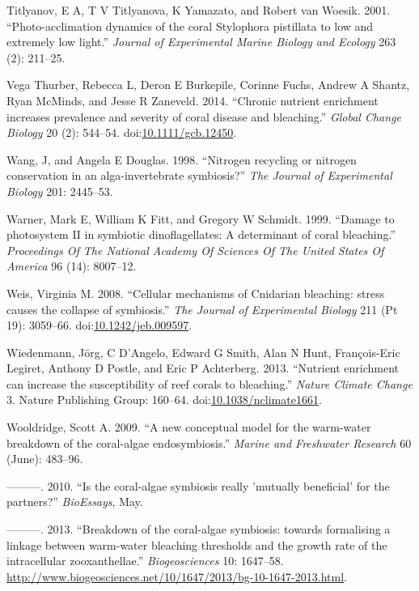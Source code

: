 \documentclass[]{elsarticle} %
\begin{document}
\hypertarget{ref-Titlyanov:2001p3631}{}
Titlyanov, E A, T V Titlyanova, K Yamazato, and Robert van Woesik. 2001.
``Photo-acclimation dynamics of the coral Stylophora pistillata to low
and extremely low light.'' \emph{Journal of Experimental Marine Biology
and Ecology} 263 (2): 211--25.

\hypertarget{ref-VegaThurber:2014hk}{}
Vega Thurber, Rebecca L, Deron E Burkepile, Corinne Fuchs, Andrew A
Shantz, Ryan McMinds, and Jesse R Zaneveld. 2014. ``Chronic nutrient
enrichment increases prevalence and severity of coral disease and
bleaching.'' \emph{Global Change Biology} 20 (2): 544--54.
doi:\href{https://doi.org/10.1111/gcb.12450}{10.1111/gcb.12450}.

\hypertarget{ref-Wang:1998p128}{}
Wang, J, and Angela E Douglas. 1998. ``Nitrogen recycling or nitrogen
conservation in an alga-invertebrate symbiosis?'' \emph{The Journal of
Experimental Biology} 201: 2445--53.

\hypertarget{ref-Warner:1999p4239}{}
Warner, Mark E, William K Fitt, and Gregory W Schmidt. 1999. ``Damage to
photosystem II in symbiotic dinoflagellates: A determinant of coral
bleaching.'' \emph{Proceedings Of The National Academy Of Sciences Of
The United States Of America} 96 (14): 8007--12.

\hypertarget{ref-Weis:2008p944}{}
Weis, Virginia M. 2008. ``Cellular mechanisms of Cnidarian bleaching:
stress causes the collapse of symbiosis.'' \emph{The Journal of
Experimental Biology} 211 (Pt 19): 3059--66.
doi:\href{https://doi.org/10.1242/jeb.009597}{10.1242/jeb.009597}.

\hypertarget{ref-Wiedenmann:2013bn}{}
Wiedenmann, Jörg, C D'Angelo, Edward G Smith, Alan N Hunt, François-Eric
Legiret, Anthony D Postle, and Eric P Achterberg. 2013. ``Nutrient
enrichment can increase the susceptibility of reef corals to
bleaching.'' \emph{Nature Climate Change} 3. Nature Publishing Group:
160--64.
doi:\href{https://doi.org/10.1038/nclimate1661}{10.1038/nclimate1661}.

\hypertarget{ref-Wooldridge:2009p7807}{}
Wooldridge, Scott A. 2009. ``A new conceptual model for the warm-water
breakdown of the coral-algae endosymbiosis.'' \emph{Marine and
Freshwater Research} 60 (June): 483--96.

\hypertarget{ref-Wooldridge:2010p7809}{}
---------. 2010. ``Is the coral-algae symbiosis really 'mutually
beneficial' for the partners?'' \emph{BioEssays}, May.

\hypertarget{ref-Wooldridge:2013tj}{}
---------. 2013. ``Breakdown of the coral-algae symbiosis: towards
formalising a linkage between warm-water bleaching thresholds and the
growth rate of the intracellular zooxanthellae.'' \emph{Biogeosciences}
10: 1647--58.
\url{http://www.biogeosciences.net/10/1647/2013/bg-10-1647-2013.html}.
\end{document}
